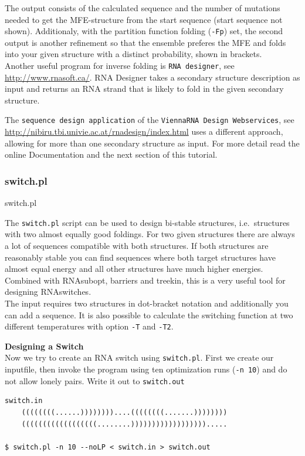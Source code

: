 \documentclass[]{article}
\begin{document}
The output consists of the calculated sequence and the number of
mutations needed to get the MFE-structure from the start sequence (start
sequence not shown). Additionaly, with the partition function folding
(\texttt{-Fp}) set, the second output is another refinement so that the
ensemble preferes the MFE and folds into your given structure with a
distinct probability, shown in brackets.\\
 Another useful program for inverse folding is \texttt{RNA\ designer},
see \url{http://www.rnasoft.ca/}. RNA Designer takes a secondary
structure description as input and returns an RNA strand that is likely
to fold in the given secondary structure.

The \texttt{sequence\ design\ application} of the
\texttt{ViennaRNA\ Design\ Webservices}, see
\url{http://nibiru.tbi.univie.ac.at/rnadesign/index.html} uses a
different approach, allowing for more than one secondary structure as
input. For more detail read the online Documentation and the next
section of this tutorial.

\subsubsection{switch.pl}{switch.pl}\label{switch.pl}

The \texttt{switch.pl} script can be used to design bi-stable
structures, i.e.~structures with two almost equally good foldings. For
two given structures there are always a lot of sequences compatible with
both structures. If both structures are reasonably stable you can find
sequences where both target structures have almost equal energy and all
other structures have much higher energies. Combined with RNAsubopt,
barriers and treekin, this is a very useful tool for designing
RNAswitches.\\
The input requires two structures in dot-bracket notation and
additionally you can add a sequence. It is also possible to calculate
the switching function at two different temperatures with option
\texttt{-T} and \texttt{-T2}.

\textbf{Designing a Switch}\\
 Now we try to create an RNA switch using \texttt{switch.pl}. First we
create our inputfile, then invoke the program using ten optimization runs
(\texttt{-n\ 10}) and do not allow lonely pairs. Write it out to
\texttt{switch.out}

\begin{verbatim}
switch.in
    ((((((((......))))))))....((((((((.......))))))))
    ((((((((((((((((((........)))))))))))))))))).....

$ switch.pl -n 10 --noLP < switch.in > switch.out
\end{verbatim}
\end{document}
